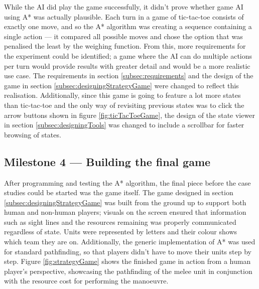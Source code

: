 \documentclass[11pt, a4paper]{report}
\begin{document}
While the AI did play the game successfully, it didn't prove whether game AI using A* was actually plausible. Each turn in a game of tic-tac-toe consists of exactly one move, and so the A* algorithm was creating a sequence containing a single action --- it compared all possible moves and chose the option that was penalised the least by the weighing function. From this, more requirements for the experiment could be identified; a game where the AI can do multiple actions per turn would provide results with greater detail and would be a more realistic use case. The requirements in section \ref{subsec:requirements} and the design of the game in section \ref{subsec:designingStrategyGame} were changed to reflect this realisation. Additionally, since this game is going to feature a lot more states than tic-tac-toe and the only way of revisiting previous states was to click the arrow buttons shown in figure \ref{fig:ticTacToeGame}, the design of the state viewer in section \ref{subsec:designingTools} was changed to include a scrollbar for faster browsing of states.

\subsection[Building the final game]{Milestone 4 --- Building the final game}
\label{subsec:buildingTheFinalGame}

After programming and testing the A* algorithm, the final piece before the case studies could be started was the game itself. The game designed in section \ref{subsec:designingStrategyGame} was built from the ground up to support both human and non-human players; visuals on the screen ensured that information such as sight lines and the resources remaining was properly communicated regardless of state. Units were represented by letters and their colour shows which team they are on. Additionally, the generic implementation of A* was used for standard pathfinding, so that players didn't have to move their units step by step. Figure \ref{fig:strategyGame} shows the finished game in action from a human player's perspective, showcasing the pathfinding of the melee unit in conjunction with the resource cost for performing the manoeuvre.
\end{document}

